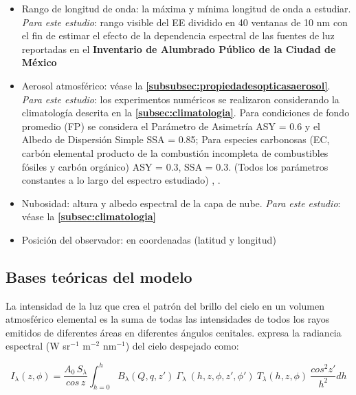 \begin{itemize}

    \item Rango de longitud de onda: la máxima y mínima longitud de onda a estudiar. \textit{Para este estudio}: rango visible del EE dividido en 40 ventanas de 10 nm con el fin  de estimar el efecto de la dependencia espectral de las fuentes de luz reportadas en el \textbf{Inventario de Alumbrado Público de la Ciudad de México}
    
    \item Aerosol atmosférico: véase la \textbf{\autoref{subsubsec:propiedadesopticasaerosol}}. \textit{Para este estudio}: los experimentos numéricos se realizaron considerando la climatología descrita en la \textbf{\autoref{subsec:climatologia}}. Para condiciones de fondo promedio (FP) se considera el Parámetro de Asimetría ASY = 0.6 y el Albedo de Dispersión Simple SSA = 0.85; Para especies carbonosas (EC, carbón elemental producto de la combustión incompleta de combustibles fósiles y carbón orgánico) ASY = 0.3, SSA = 0.3. (Todos los parámetros constantes a lo largo del espectro estudiado) \citep{Penner1998}, \citep{Schmidt2010}.
    
    \item Nubosidad: altura y albedo espectral de la capa de nube. \textit{Para este estudio}: véase la \textbf{\autoref{subsec:climatologia}}
    
    \item Posición del observador: en coordenadas (latitud y longitud) 
    
\end{itemize}

\subsection{Bases teóricas del modelo}

La intensidad de la luz que crea el patrón del brillo del cielo en un volumen atmosférico elemental es la suma de todas las intensidades de todos los rayos emitidos de diferentes áreas en diferentes ángulos cenitales. \cite{Kocifaj2007} expresa la radiancia espectral (W sr$^{-1}$  m$^{-2}$ nm$^{-1}$) del cielo despejado como:

\begin{equation}\label{eq:2.1}
I_{\lambda}(z, \phi) = \frac{A_{0}\, S_{\lambda}}{cos\,z} \int_{h=0}^{h} B_{\lambda}(Q, q, z') \: \Gamma_{\lambda} \:(h, z, \phi, z', \phi') \: T_{\lambda}(h, z, \phi) \: \frac{cos^{2}z'}{h^{2}} dh
\end{equation}

